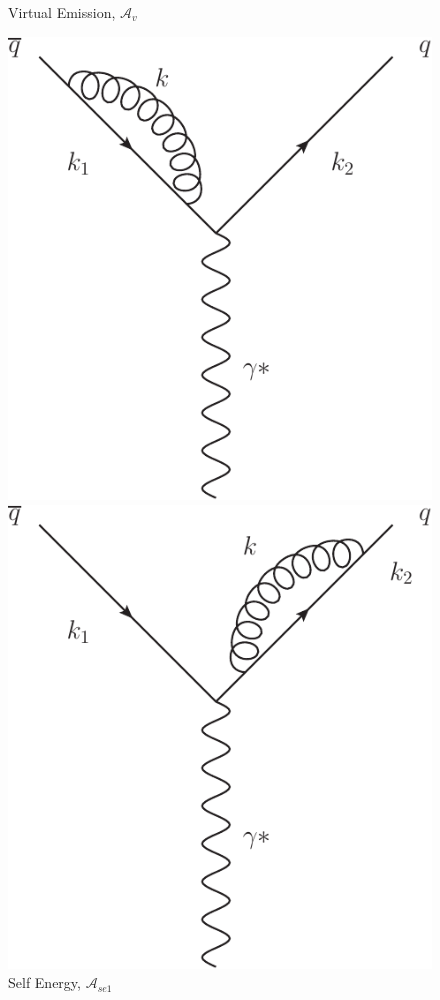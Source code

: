 \begin{figure}[tpb]
\begin{minipage}{0.4\linewidth}
				\caption{Virtual Emission, $\mathcal{A}_v$}
				\label{fig:NLOfig_2}
			\end{minipage}
			\begin{minipage}{0.4\linewidth}
				\centering
				\includegraphics[width=0.98\linewidth]{NLOSelfEnergyLeft}
				\caption{Self Energy, $\mathcal{A}_{se1}$}
				\label{fig:NLOfig_3}
			\end{minipage}
			\begin{minipage}{0.4\linewidth}
				\centering
				\includegraphics[width=0.98\linewidth]{NLOSelfEnergyRight}

\end{minipage}
\end{figure}
